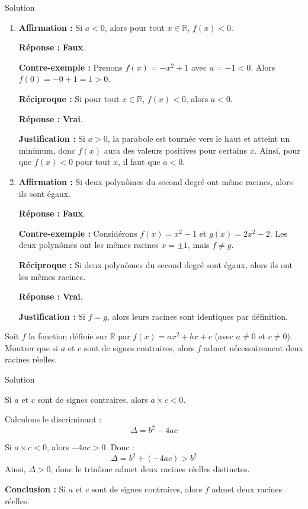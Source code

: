 \documentclass[a4paper,12pt]{article}
\begin{document}
\begin{solutionbox}{Solution}
\begin{enumerate}
    \item \textbf{Affirmation :} Si \(a < 0\), alors pour tout \( x \in \mathbb{R} \), \(f(x) < 0\).

    \textbf{Réponse :} \textbf{Faux}.

    \textbf{Contre-exemple :} Prenons \(f(x) = -x^2 + 1\) avec \(a = -1 < 0\). Alors \(f(0) = -0 + 1 = 1 > 0\).

    \textbf{Réciproque :} Si pour tout \( x \in \mathbb{R} \), \(f(x) < 0\), alors \(a < 0\).

    \textbf{Réponse :} \textbf{Vrai}.

    \textbf{Justification :} Si \(a > 0\), la parabole est tournée vers le haut et atteint un minimum, donc \(f(x)\) aura des valeurs positives pour certains \(x\). Ainsi, pour que \(f(x) < 0\) pour tout \(x\), il faut que \(a < 0\).

    \item \textbf{Affirmation :} Si deux polynômes du second degré ont même racines, alors ils sont égaux.

    \textbf{Réponse :} \textbf{Faux}.

    \textbf{Contre-exemple :} Considérons \(f(x) = x^2 - 1\) et \(g(x) = 2x^2 - 2\). Les deux polynômes ont les mêmes racines \(x = \pm1\), mais \(f \neq g\).

    \textbf{Réciproque :} Si deux polynômes du second degré sont égaux, alors ils ont les mêmes racines.

    \textbf{Réponse :} \textbf{Vrai}.

    \textbf{Justification :} Si \(f = g\), alors leurs racines sont identiques par définition.

\end{enumerate}
\end{solutionbox}

\begin{exercice}[title=Exercice 17 \quad$\star\star$\quad\ {Raisonner, Communiquer}]
Soit \(f\) la fonction définie sur \( \mathbb{R} \) par \( f(x) = ax^2 + bx + c \) (avec \( a \neq 0 \) et \( c \neq 0 \)). Montrer que si \(a\) et \(c\) sont de signes contraires, alors \(f\) admet nécessairement deux racines réelles.
\end{exercice}

\begin{solutionbox}{Solution}

Si \(a\) et \(c\) sont de signes contraires, alors \(a \times c < 0\).

Calculons le discriminant :
\[
\Delta = b^2 - 4ac
\]

Si \(a \times c < 0\), alors \(-4ac > 0\). Donc :
\[
\Delta = b^2 + (-4ac) > b^2
\]
Ainsi, \(\Delta > 0\), donc le trinôme admet deux racines réelles distinctes.

\textbf{Conclusion :} Si \(a\) et \(c\) sont de signes contraires, alors \(f\) admet deux racines réelles.

\end{solutionbox}
\end{document}
